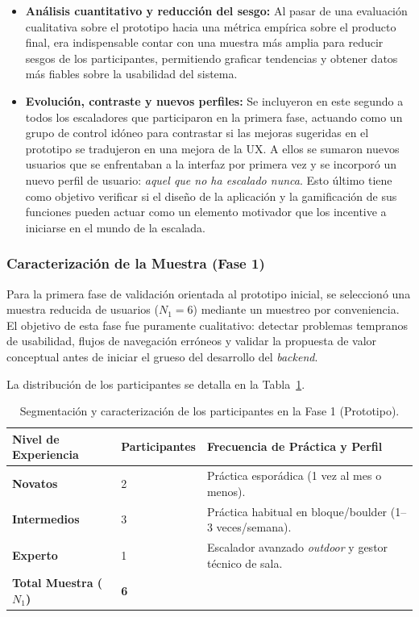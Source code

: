 \begin{itemize}
    \item \textbf{Análisis cuantitativo y reducción del sesgo:} Al pasar de una evaluación cualitativa sobre el prototipo hacia una métrica empírica sobre el producto final, era indispensable contar con una muestra más amplia para reducir sesgos de los participantes, permitiendo graficar tendencias y obtener datos más fiables sobre la usabilidad del sistema.
    \item \textbf{Evolución, contraste y nuevos perfiles:} Se incluyeron en este segundo a todos los escaladores que participaron en la primera fase, actuando como un grupo de control idóneo para contrastar si las mejoras sugeridas en el prototipo se tradujeron en una mejora de la UX. A ellos se sumaron nuevos usuarios que se enfrentaban a la interfaz por primera vez y se incorporó un nuevo perfil de usuario: \textit{aquel que no ha escalado nunca}. Esto último tiene como objetivo verificar si el diseño de la aplicación y la gamificación de sus funciones pueden actuar como un elemento motivador que los incentive a iniciarse en el mundo de la escalada.
\end{itemize}

\subsubsection{Caracterización de la Muestra (Fase 1)}

Para la primera fase de validación orientada al prototipo inicial, se seleccionó una muestra reducida de usuarios ($N_1 = 6$) mediante un muestreo por conveniencia. El objetivo de esta fase fue puramente cualitativo: detectar problemas tempranos de usabilidad, flujos de navegación erróneos y validar la propuesta de valor conceptual antes de iniciar el grueso del desarrollo del \textit{backend}. 

La distribución de los participantes se detalla en la Tabla~\ref{tab:perfilUsuariosFase1}.

\begin{table}[htbp]
\centering
\small
\renewcommand{\arraystretch}{1.2}
\begin{tabular}{lp{2.5cm}p{7.5cm}}
\hline
\textbf{Nivel de Experiencia} & \textbf{Participantes} & \textbf{Frecuencia de Práctica y Perfil} \\ \hline
\textbf{Novatos}              & 2                      & Práctica esporádica (1 vez al mes o menos). \\
\textbf{Intermedios}          & 3                      & Práctica habitual en bloque/boulder (1--3 veces/semana). \\
\textbf{Experto}              & 1                      & Escalador avanzado \textit{outdoor} y gestor técnico de sala. \\ \hline
\textbf{Total Muestra ($N_1$)} & \textbf{6}             &  \\ \hline
\end{tabular}
\caption{Segmentación y caracterización de los participantes en la Fase 1 (Prototipo).}
\label{tab:perfilUsuariosFase1}
\end{table}

